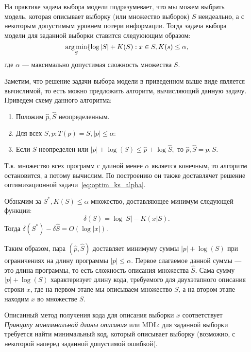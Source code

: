 \documentclass[../main.tex]{subfiles}
\begin{document}
На практике задача выбора модели подразумевает, что мы можем выбрать модель, которая описывает выборку (или множество выборок) $S$ неидеально, а с некоторым допустимым уровнем потери информации.
Тогда задача выбора модели для заданной выборки ставится следуюющим образом:
\begin{equation}
\label{eq:optim_ks_alpha}
	\operatorname*{arg\,min}_{S} \{\log|S| + K(S): x \in S, K(s) \leq \alpha,
\end{equation}
где $\alpha$ --- максимально допустимая сложность множества $S$.

Заметим, что решение задачи выбора модели в приведенном выше виде является вычислимой, то есть можно предложить алгоритм, вычисляющий данную задачу. Приведем схему данного алгоритма:
\begin{enumerate}
\item Положим $\hat{p}, \hat{S}$ неопределенным.
\item Для всех $S, p: T(p) = S, |p| \leq \alpha$:
\item Если $\hat{S}$ неопределен или $|p| + \log(S) \leq \hat{p} + \log{\hat{S}},$ то $\hat{p}, \hat{S} = p, S$. 
\end{enumerate}
Т.к. множество всех программ с длиной менее $\alpha$ является конечным, то алгоритм остановится, а потому вычислим. По построению он также доставлячет решение оптимизационной задачи~\eqref{eq:optim_ks_alpha}.

\begin{theorembd}
Обзначим за $S^{*}, K(S) \leq \alpha$  множество, доставляющее минимум следующей функции:
\[
    \delta(S) = \log{|S|} - K(x|S).
\]
Тогда  $\delta(S^{*}) - \delta{\hat{S}} = O(\log |x|).$
\end{theorembd}

Таким образом, пара $(\hat{p}, \hat{S})$ доставляет минимуму суммы $|p| + \log(S)$ при ограничениях на длину программы $|p| \leq \alpha$. Первое слагаемое данной суммы --- это длина  программы, то есть сложность описания множества $\hat{S}$. Сама сумму $|p| + \log(S)$ характеризует длину кода, требуемого для двухэтапного описания строки $x$, где на первом этапе мы описываем множество $S$, а на втором этапе находим $x$ во множестве $S$.

Описанный метод получения кода для описания выборки $x$ соответствует \textit{Принципу миниммальной длины описания} или MDL: для заданной выборки требуется найти минимальный код, который описывает выборку (возможно, с некоторой наперед заданной допустимой ошибкой(.
\end{document}
